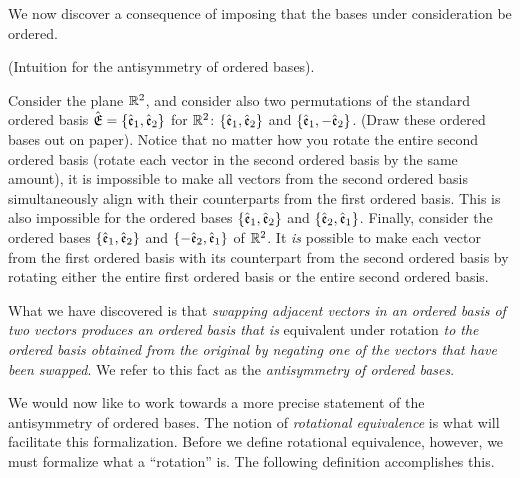 We now discover a consequence of imposing that the bases under consideration be ordered.

\begin{deriv}
\label{ch::exterior_pwrs::deriv::ordered_bases_antisymmetry_intuition}
    (Intuition for the antisymmetry of ordered bases).
    
    Consider the plane $\mathbb{R}^2$, and consider also two permutations of the standard ordered basis ${\hat{\mathfrak{E}}} = \{\hat{\mathfrak{e}}_1, \hat{\mathfrak{e}}_2\}$ for $\mathbb{R}^2$: $\{\hat{\mathfrak{e}}_1, \hat{\mathfrak{e}}_2\}$ and $\{\hat{\mathfrak{e}}_1, -\hat{\mathfrak{e}}_2\}$. (Draw these ordered bases out on paper). Notice that no matter how you rotate the entire second ordered basis (rotate each vector in the second ordered basis by the same amount), it is impossible to make all vectors from the second ordered basis simultaneously align with their counterparts from the first ordered basis. This is also impossible for the ordered bases $\{\hat{\mathfrak{e}}_1, \hat{\mathfrak{e}}_2\}$ and $\{\hat{\mathfrak{e}}_2, \hat{\mathfrak{e}}_1\}$. Finally, consider the ordered bases $\{\hat{\mathfrak{e}}_1, \hat{\mathfrak{e}}_2\}$ and $\{-\hat{\mathfrak{e}}_2, \hat{\mathfrak{e}}_1\}$ of $\mathbb{R}^2$. It \textit{is} possible to make each vector from the first ordered basis with its counterpart from the second ordered basis by rotating either the entire first ordered basis or the entire second ordered basis.
    
    What we have discovered is that \textit{swapping adjacent vectors in an ordered basis of two vectors produces an ordered basis that is} equivalent under rotation \textit{to the ordered basis obtained from the original by negating one of the vectors that have been swapped}. We refer to this fact as the \textit{antisymmetry of ordered bases}.
\end{deriv}

We would now like to work towards a more precise statement of the antisymmetry of ordered bases. The notion of \textit{rotational equivalence} is what will facilitate this formalization. Before we define rotational equivalence, however, we must formalize what a ``rotation'' is. The following definition accomplishes this.

